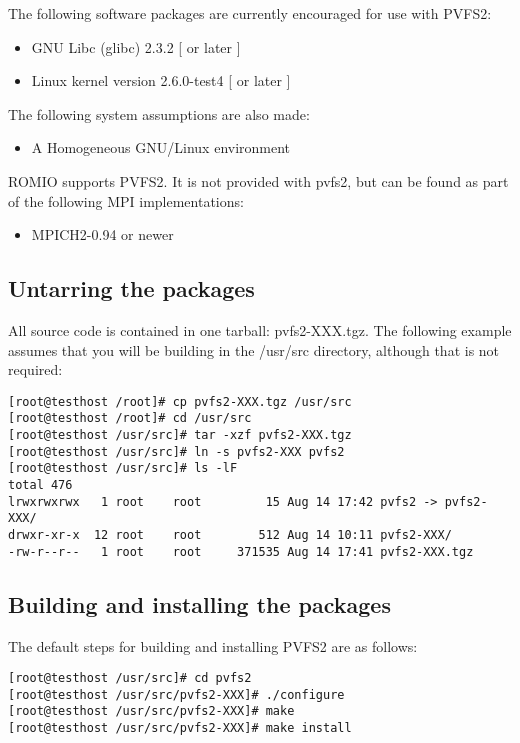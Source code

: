 \documentclass[11pt, letterpaper]{article}
\begin{document}
The following software packages are currently encouraged for use with PVFS2:
\begin{itemize}
\item GNU Libc (glibc) 2.3.2 [ or later ]
\item Linux kernel version 2.6.0-test4 [ or later ]
\end{itemize}

The following system assumptions are also made:
\begin{itemize}
\item A Homogeneous GNU/Linux environment
\end{itemize}

ROMIO supports PVFS2.  It is not provided with pvfs2, but can be found as part
of the following MPI implementations:

\begin{itemize}
\item MPICH2-0.94 or newer
\end{itemize}

\subsection{Untarring the packages}

All source code is contained in one tarball: pvfs2-XXX.tgz.  The
following example assumes that you will be building in the /usr/src
directory, although that is not required:

\begin{verbatim}
[root@testhost /root]# cp pvfs2-XXX.tgz /usr/src
[root@testhost /root]# cd /usr/src
[root@testhost /usr/src]# tar -xzf pvfs2-XXX.tgz
[root@testhost /usr/src]# ln -s pvfs2-XXX pvfs2
[root@testhost /usr/src]# ls -lF
total 476
lrwxrwxrwx   1 root    root         15 Aug 14 17:42 pvfs2 -> pvfs2-XXX/
drwxr-xr-x  12 root    root        512 Aug 14 10:11 pvfs2-XXX/
-rw-r--r--   1 root    root     371535 Aug 14 17:41 pvfs2-XXX.tgz

\end{verbatim}

\subsection{Building and installing the packages}

The default steps for building and installing PVFS2 are as follows:

\begin{verbatim}
[root@testhost /usr/src]# cd pvfs2
[root@testhost /usr/src/pvfs2-XXX]# ./configure
[root@testhost /usr/src/pvfs2-XXX]# make
[root@testhost /usr/src/pvfs2-XXX]# make install
\end{verbatim}
\end{document}
